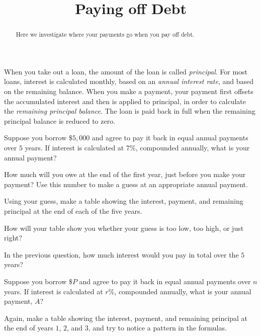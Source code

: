 \documentclass{ximera}
\title{Paying off Debt}
\begin{document}
\begin{abstract}
Here we investigate where your payments go when you pay off debt.
\end{abstract}
\maketitle

When you take out a loan, the amount of the loan is called \emph{principal}.  For most loans, interest is calculated monthly, based on an \emph{annual interest rate}, and based on the remaining balance.  When you make a payment, your payment first offsets the accumulated interest and then is applied to principal, in order to calculate the \emph{remaining principal balance}.  The loan is paid back in full when the remaining principal balance is reduced to zero.  
\begin{question}
Suppose you borrow $\$5,000$ and agree to pay it back in equal annual payments over $5$ years.  If interest is calculated at $7\%$, compounded annually, what is your annual payment?  
\begin{solution}
\begin{hint}
How much will you owe at the end of the first year, just before you make your payment?  Use this number to make a guess at an appropriate annual payment.  
\end{hint}
\begin{hint}
Using your guess, make a table showing the interest, payment, and remaining principal at the end of each of the five years.  
\end{hint}
\begin{hint}
How will your table show you whether your guess is too low, too high, or just right?  
\end{hint}
\begin{freeResponse}
\end{freeResponse}
\end{solution}
\end{question}

\begin{question}
In the previous question, how much interest would you pay in total over the $5$ years? 
\begin{freeResponse}
\end{freeResponse}
\end{question}

\begin{question}
Suppose you borrow  $\$P$ and agree to pay it back in equal annual payments over $n$ years.  If interest is calculated at $r\%$, compounded annually, what is your annual payment, $A$?  
\begin{hint}
Again, make a table showing the interest, payment, and remaining principal at the end of years $1$, $2$, and $3$, and try to notice a pattern in the formulas.  
\end{hint} 
\begin{freeResponse}
\end{freeResponse}
\end{question}
\end{document}
